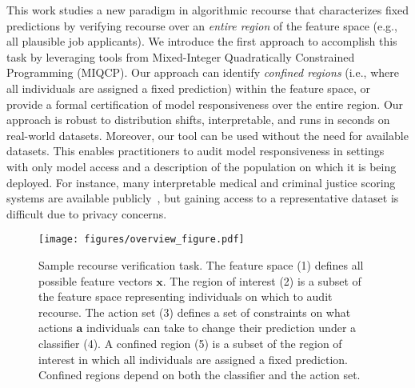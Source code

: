 
This work studies a new paradigm in algorithmic recourse that characterizes fixed predictions by verifying recourse over an \emph{entire region} of the feature space (e.g., all plausible job applicants). 
We introduce the first approach to accomplish this task by leveraging tools from Mixed-Integer Quadratically Constrained Programming (MIQCP). Our approach can identify \emph{confined regions} (i.e., where all individuals are assigned a fixed prediction) within the feature space, or provide a formal certification of model responsiveness over the entire region. Our approach is robust to distribution shifts, interpretable, and runs in seconds on real-world datasets.  Moreover, our tool can be used without the need for available datasets. This enables practitioners to audit model responsiveness in settings with only model access and a description of the population on which it is being deployed. For instance, many interpretable medical and criminal justice scoring systems are available publicly~\citep[see e.g.,][]{morrison2022optimized, yamga2023optimized, ribeiro2023use, PennSentence}, but gaining access to a representative dataset is difficult due to privacy concerns. 

\begin{figure*}
    \centering
    \texttt{[image: figures/overview\_figure.pdf]}
    \vspace{-2em}
    \caption{Sample recourse verification task. The feature space (1) defines all possible feature vectors $\mathbf{x}$. The region of interest (2) is a subset of the feature space representing individuals on which to audit recourse. The action set (3) defines a set of constraints on what actions $\mathbf{a}$ individuals can take to change their prediction under a classifier (4). A confined region (5) is a subset of the region of interest in which all individuals are assigned a fixed prediction. Confined regions depend on both the classifier and the action set.}
    \label{fig:summary}
    \vspace{-1em}
\end{figure*}

